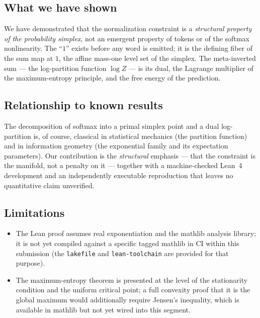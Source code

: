 \documentclass[11pt]{article}
\begin{document}
\subsection{What we have shown}
\label{sec:disc-what}

We have demonstrated that the normalization constraint is a \emph{structural
property of the probability simplex}, not an emergent property of tokens or of
the softmax nonlinearity. The ``$1$'' exists before any word is emitted; it is
the defining fiber of the sum map at $1$, the affine mass-one level set of the
simplex.
The meta-inverted sum --- the log-partition function $\log Z$ --- is its dual,
the Lagrange multiplier of the maximum-entropy principle, and the free energy of
the prediction.

\subsection{Relationship to known results}
\label{sec:disc-known}

The decomposition of softmax into a primal simplex point and a dual
log-partition is, of course, classical in statistical mechanics (the partition
function) and in information geometry (the exponential family and its
expectation parameters). Our contribution is the \emph{structural} emphasis ---
that the constraint is the manifold, not a penalty on it --- together with a
machine-checked Lean~4 development and an independently executable
reproduction that leaves no quantitative claim unverified.

\subsection{Limitations}
\label{sec:disc-lim}

\begin{itemize}
\item The Lean proof assumes real exponentiation and the mathlib analysis
library; it is not yet compiled against a specific tagged mathlib in CI within
this submission (the \texttt{lakefile} and \texttt{lean-toolchain} are provided
for that purpose).
\item The maximum-entropy theorem is presented at the level of the
stationarity condition and the uniform critical point; a full convexity proof
that it is the global maximum would additionally require Jensen's inequality,
which is available in mathlib but not yet wired into this segment.
\end{itemize}
\end{document}
